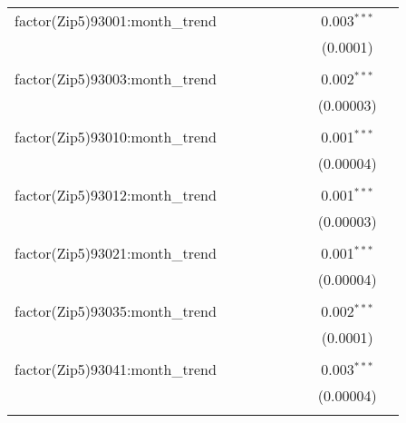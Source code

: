 \begin{table}[H]
{\begin{tabular}{@{\extracolsep{5pt}}lcccccccc}
  factor(Zip5)93001:month\_trend &  &  &  &  &  &  & 0.003$^{***}$ &  \\  

   &  &  &  &  &  &  & (0.0001) &  \\  

   & & & & & & & & \\  

  factor(Zip5)93003:month\_trend &  &  &  &  &  &  & 0.002$^{***}$ &  \\  

   &  &  &  &  &  &  & (0.00003) &  \\  

   & & & & & & & & \\  

  factor(Zip5)93010:month\_trend &  &  &  &  &  &  & 0.001$^{***}$ &  \\  

   &  &  &  &  &  &  & (0.00004) &  \\  

   & & & & & & & & \\  

  factor(Zip5)93012:month\_trend &  &  &  &  &  &  & 0.001$^{***}$ &  \\  

   &  &  &  &  &  &  & (0.00003) &  \\  

   & & & & & & & & \\  

  factor(Zip5)93021:month\_trend &  &  &  &  &  &  & 0.001$^{***}$ &  \\  

   &  &  &  &  &  &  & (0.00004) &  \\  

   & & & & & & & & \\  

  factor(Zip5)93035:month\_trend &  &  &  &  &  &  & 0.002$^{***}$ &  \\  

   &  &  &  &  &  &  & (0.0001) &  \\  

   & & & & & & & & \\  

  factor(Zip5)93041:month\_trend &  &  &  &  &  &  & 0.003$^{***}$ &  \\  

   &  &  &  &  &  &  & (0.00004) &  \\  

   & & & & & & & & \\  


\end{tabular}}
\end{table}
